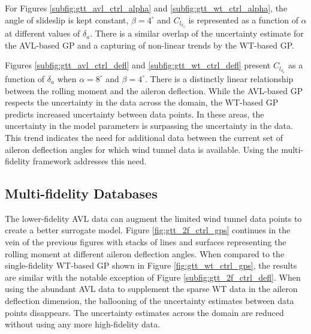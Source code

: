 For Figures \ref{subfig:gtt_avl_ctrl_alpha} and \ref{subfig:gtt_wt_ctrl_alpha}, the angle of slideslip is kept constant, $\beta=4^\circ$ and $C_{l_{\delta_a}}$ is represented as a function of $\alpha$ at different values of $\delta_a$.
There is a similar overlap of the uncertainty estimate for the AVL-based GP and a capturing of non-linear trends by the WT-based GP. 

Figures \ref{subfig:gtt_avl_ctrl_defl} and \ref{subfig:gtt_wt_ctrl_defl} present $C_{l_{\delta_a}}$ as a function of $\delta_a$ when $\alpha = 8^\circ$ and $\beta = 4^\circ$.
There is a distinctly linear relationship between the rolling moment and the aileron deflection. 
While the AVL-based GP respects the uncertainty in the data across the domain, the WT-based GP predicts increased uncertainty between data points. 
In these areas, the uncertainty in the model parameters is surpassing the uncertainty in the data.
This trend indicates the need for additional data between the current set of aileron deflection angles for which wind tunnel data is available.
Using the multi-fidelity framework addresses this need.

\subsection{Multi-fidelity Databases}
The lower-fidelity AVL data can augment the limited wind tunnel data points to create a better surrogate model.
Figure \ref{fig:gtt_2f_ctrl_gps} continues in the vein of the previous figures with stacks of lines and surfaces representing the rolling moment at different aileron deflection angles. 
When compared to the single-fidelity WT-based GP shown in Figure \ref{fig:gtt_wt_ctrl_gps}, the results are similar with the notable exception of Figure \ref{subfig:gtt_2f_ctrl_defl}.
When using the abundant AVL data to supplement the sparse WT data in the aileron deflection dimension, the ballooning of the uncertainty estimates between data points disappears. 
The uncertainty estimates across the domain are reduced without using any more high-fidelity data. 

